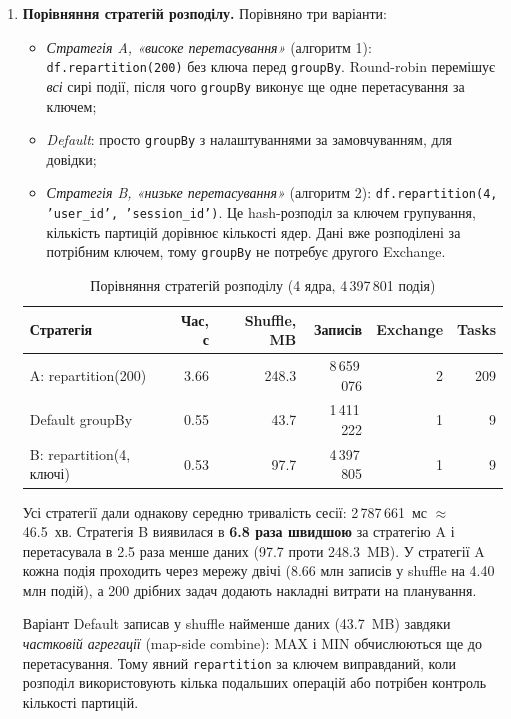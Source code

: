 \begin{enumerate}
  \item \textbf{Порівняння стратегій розподілу.} Порівняно три варіанти:
  \begin{itemize}
    \item \emph{Стратегія A, «високе перетасування»} (алгоритм 1): \texttt{df.repartition(200)} без ключа перед \texttt{groupBy}. Round-robin перемішує \emph{всі} сирі події, після чого \texttt{groupBy} виконує ще одне перетасування за ключем;
    \item \emph{Default}: просто \texttt{groupBy} з налаштуваннями за замовчуванням, для довідки;
    \item \emph{Стратегія B, «низьке перетасування»} (алгоритм 2): \texttt{df.repartition(4, 'user\_id', 'session\_id')}. Це hash-розподіл за ключем групування, кількість партицій дорівнює кількості ядер. Дані вже розподілені за потрібним ключем, тому \texttt{groupBy} не потребує другого Exchange.
  \end{itemize}

\begin{table}[H]
\centering
\caption{Порівняння стратегій розподілу (4 ядра, 4\,397\,801 подія)}
\label{tab:strat}
\begin{tabular}{lrrrrr}
\toprule
Стратегія & Час, с & Shuffle, MB & Записів & Exchange & Tasks \\
\midrule
A: repartition(200) & 3.66 & 248.3 & 8\,659\,076 & 2 & 209 \\
Default groupBy & 0.55 & 43.7 & 1\,411\,222 & 1 & 9 \\
B: repartition(4, ключі) & 0.53 & 97.7 & 4\,397\,805 & 1 & 9 \\
\bottomrule
\end{tabular}
\end{table}

Усі стратегії дали однакову середню тривалість сесії: 2\,787\,661~мс \(\approx\) 46.5~хв. Стратегія B виявилася в \textbf{6.8 раза швидшою} за стратегію A і перетасувала в 2.5 раза менше даних (97.7 проти 248.3~MB). У стратегії A кожна подія проходить через мережу двічі (8.66 млн записів у shuffle на 4.40 млн подій), а 200 дрібних задач додають накладні витрати на планування.

  Варіант Default записав у shuffle найменше даних (43.7~MB) завдяки \emph{частковій агрегації} (map-side combine): MAX і MIN обчислюються ще до перетасування. Тому явний \texttt{repartition} за ключем виправданий, коли розподіл використовують кілька подальших операцій або потрібен контроль кількості партицій.


\end{enumerate}
